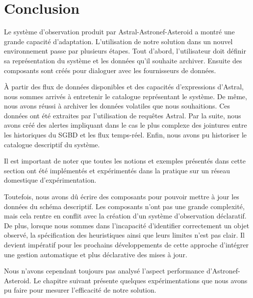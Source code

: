 \section{Conclusion}\label{sec:valid:domvision:conclusion}
Le système d'observation produit par Astral-Astronef-Asteroid a montré une grande capacité d'adaptation. L'utilisation de notre solution dans un nouvel environnement passe par plusieurs étapes. Tout d'abord, l'utilisateur doit définir sa représentation du système et les données qu'il souhaite archiver. Ensuite des composants sont créés pour dialoguer avec les fournisseurs de données.

À partir des flux de données disponibles et des capacités d'expressions d'Astral, nous sommes arrivés à entretenir le catalogue représentant le système. De même, nous avons réussi à archiver les données volatiles que nous souhaitions. Ces données ont été extraites par l'utilisation de requêtes Astral. Par la suite, nous avons créé des alertes impliquant dans le cas le plus complexe des jointures entre les historiques du SGBD et les flux temps-réel. Enfin, nous avons pu historiser le catalogue descriptif du système.

Il est important de noter que toutes les notions et exemples présentés dans cette section ont été implémentés et expérimentés dans la pratique sur un réseau domestique d'expérimentation.

Toutefois, nous avons dû écrire des composants pour pouvoir mettre à jour les données du schéma descriptif. Les composants n'ont pas une grande complexité, mais cela rentre en conflit avec la création d'un système d'observation déclaratif. De plus, lorsque nous sommes dans l'incapacité d'identifier correctement un objet observé, la spécification des heuristiques ainsi que leurs limites n'est pas clair. Il devient impératif pour les prochains développements de cette approche d'intégrer une gestion automatique et plus déclarative des mises à jour.

Nous n'avons cependant toujours pas analysé l'aspect performance d'Astronef-Asteroid. Le chapitre suivant présente quelques expérimentations que nous avons pu faire pour mesurer l'efficacité de notre solution.

